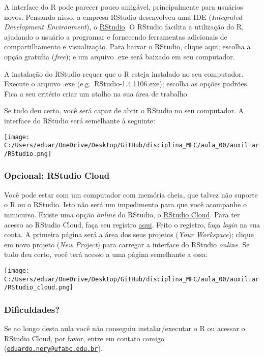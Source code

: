 \documentclass[
]{article}
\begin{document}
A interface do R pode parecer pouco amigável, principalmente para
usuários novos. Pensando nisso, a empresa RStudio desenvolveu uma IDE
(\emph{Integrated Development Environment}), o
\href{https://www.rstudio.com/}{RStudio}. O RStudio facilita a
utilização do R, ajudando o usuário a programar e fornecendo ferramentas
adicionais de compartilhamento e visualização. Para baixar o RStudio,
clique \href{https://www.rstudio.com/products/rstudio/download/}{aqui};
escolha a opção gratuíta (\emph{free}); e um arquivo .exe será baixado
em seu computador.

A instalação do RStudio requer que o R esteja instalado no seu
computador. Execute o arquivo .exe (e.g.~RStudio-1.4.1106.exe); escolha
as opções padrões. Fica a seu critério criar um atalho na sua área de
trabalho.

Se tudo deu certo, você será capaz de abrir o RStudio no seu computador.
A interface do RStudio será semelhante à seguinte:

\texttt{[image: C:/Users/eduar/OneDrive/Desktop/GitHub/disciplina\_MFC/aula\_00/auxiliar/RStudio.png]}

\hypertarget{opcional-rstudio-cloud}{%
\subsubsection{Opcional: RStudio Cloud}\label{opcional-rstudio-cloud}}

Você pode estar com um computador com memória cheia, que talvez não
suporte o R ou o RStudio. Isto não será um impedimento para que você
acompanhe o minicurso. Existe uma opção \emph{online} do RStudio, o
\href{https://rstudio.cloud/}{RStudio Cloud}. Para ter acesso ao RStudio
Cloud, faça seu registro
\href{https://login.rstudio.cloud/register?redirect=\%2Foauth\%2Fauthorize\%3Fredirect_uri\%3Dhttps\%253A\%252F\%252Frstudio.cloud\%252Flogin\%26client_id\%3Drstudio-cloud\%26response_type\%3Dcode\%26show_auth\%3D0\%26show_login\%3D1\%26show_setup\%3D0\&setup=False}{aqui}.
Feito o registro, faça \emph{login} na sua conta. A primeira página será
a área dos seus projetos (\emph{Your Workspace}); clique em novo projeto
(\emph{New Project}) para carregar a interface do RStudio \emph{online}.
Se tudo deu certo, você terá acesso a uma página semelhante a essa:

\texttt{[image: C:/Users/eduar/OneDrive/Desktop/GitHub/disciplina\_MFC/aula\_00/auxiliar/RStudio\_cloud.png]}

\hypertarget{dificuldades}{%
\subsubsection{Dificuldades?}\label{dificuldades}}

Se ao longo desta aula você não conseguiu instalar/executar o R ou
acessar o RStudio Cloud, por favor, entre em contato comigo
(\href{mailto:eduardo.nery@ufabc.edu.br}{\nolinkurl{eduardo.nery@ufabc.edu.br}}).
\end{document}
